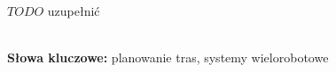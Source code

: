 \\

\\

\begin{singlespacing}

$TODO$ uzupełnić




\flushbottom
\textbf{\\Słowa kluczowe: }planowanie tras, systemy wielorobotowe
\end{singlespacing}
